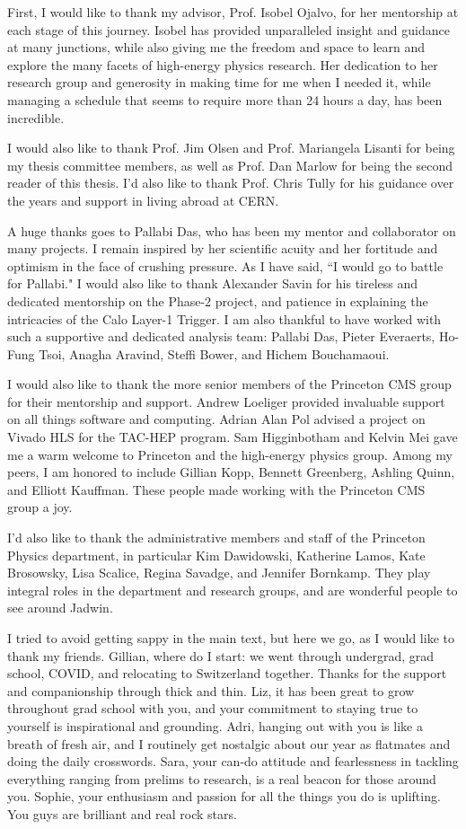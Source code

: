 

First, I would like to thank my advisor, Prof. Isobel Ojalvo, for her mentorship at each stage of this journey. Isobel has provided unparalleled insight and guidance at many junctions, while also giving me the freedom and space to learn and explore the many facets of high-energy physics research. Her dedication to her research group and generosity in making time for me when I needed it, while managing a schedule that seems to require more than 24 hours a day, has been incredible.

I would also like to thank Prof. Jim Olsen and Prof. Mariangela Lisanti for being my thesis committee members, as well as Prof. Dan Marlow for being the second reader of this thesis. I'd also like to thank Prof. Chris Tully for his guidance over the years and support in living abroad at CERN.

A huge thanks goes to Pallabi Das, who has been my mentor and collaborator on many projects. I remain inspired by her scientific acuity and her fortitude and optimism in the face of crushing pressure. As I have said, ``I would go to battle for Pallabi." I would also like to thank Alexander Savin for his tireless and dedicated mentorship on the Phase-2 project, and patience in explaining the intricacies of the Calo Layer-1 Trigger. I am also thankful to have worked with such a supportive and dedicated analysis team: Pallabi Das, Pieter Everaerts, Ho-Fung Tsoi, Anagha Aravind, Steffi Bower, and Hichem Bouchamaoui. 

I would also like to thank the more senior members of the Princeton CMS group for their mentorship and support. Andrew Loeliger provided invaluable support on all things software and computing. Adrian Alan Pol advised a project on Vivado HLS for the TAC-HEP program. Sam Higginbotham and Kelvin Mei gave me a warm welcome to Princeton and the high-energy physics group. Among my peers, I am honored to include Gillian Kopp, Bennett Greenberg, Ashling Quinn, and Elliott Kauffman. These people made working with the Princeton CMS group a joy.

I'd also like to thank the administrative members and staff of the Princeton Physics department, in particular Kim Dawidowski, Katherine Lamos, Kate Brosowsky,  Lisa Scalice, Regina Savadge, and Jennifer Bornkamp. They play integral roles in the department and research groups, and are wonderful people to see around Jadwin.

I tried to avoid getting sappy in the main text, but here we go, as I would like to thank my friends. Gillian, where do I start: we went through undergrad, grad school, COVID, and relocating to Switzerland together. Thanks for the support and companionship through thick and thin. Liz, it has been great to grow throughout grad school with you, and your commitment to staying true to yourself is inspirational and grounding. Adri, hanging out with you is like a breath of fresh air, and I routinely get nostalgic about our year as flatmates and doing the daily crosswords. Sara, your can-do attitude and fearlessness in tackling everything ranging from prelims to research, is a real beacon for those around you. Sophie, your enthusiasm and passion for all the things you do is uplifting. You guys are brilliant and real rock stars.

